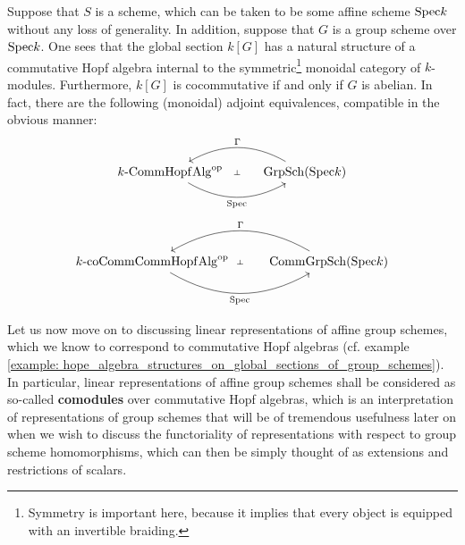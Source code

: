             \begin{example} \label{example: hope_algebra_structures_on_global_sections_of_group_schemes}
                Suppose that $S$ is a scheme, which can be taken to be some affine scheme $\mathrm{Spec} k$ without any loss of generality. In addition, suppose that $G$ is a group scheme over $\mathrm{Spec} k$. One sees that the global section $k[G]$ has a natural structure of a commutative Hopf algebra internal to the symmetric\footnote{Symmetry is important here, because it implies that every object is equipped with an invertible braiding.} monoidal category of $k$-modules. Furthermore, $k[G]$ is cocommutative if and only if $G$ is abelian. In fact, there are the following (monoidal) adjoint equivalences, compatible in the obvious manner:
                    $$
                        \begin{tikzcd}
                        	{k\-\Comm\Hopf\Alg^{\op}} & {\Grp\Sch(\Spec k)}
                        	\arrow[""{name=0, anchor=center, inner sep=0}, "{\Spec }"', bend right, from=1-1, to=1-2]
                        	\arrow[""{name=1, anchor=center, inner sep=0}, "\Gamma"', bend right, from=1-2, to=1-1]
                        	\arrow["\dashv"{anchor=center, rotate=-90}, draw=none, from=1, to=0]
                        \end{tikzcd}
                    $$
                    $$
                        \begin{tikzcd}
                        	{k\-\co\Comm\Comm\Hopf\Alg^{\op}} & {\Comm\Grp\Sch(\Spec k)}
                        	\arrow[""{name=0, anchor=center, inner sep=0}, "{\Spec }"', bend right, from=1-1, to=1-2]
                        	\arrow[""{name=1, anchor=center, inner sep=0}, "\Gamma"', bend right, from=1-2, to=1-1]
                        	\arrow["\dashv"{anchor=center, rotate=-90}, draw=none, from=1, to=0]
                        \end{tikzcd}
                    $$
            \end{example}
            
            Let us now move on to discussing linear representations of affine group schemes, which we know to correspond to commutative Hopf algebras (cf. example \ref{example: hope_algebra_structures_on_global_sections_of_group_schemes}). In particular, linear representations of affine group schemes shall be considered as so-called \textbf{comodules} over commutative Hopf algebras, which is an interpretation of representations of group schemes that will be of tremendous usefulness later on when we wish to discuss the functoriality of representations with respect to group scheme homomorphisms, which can then be simply thought of as extensions and restrictions of scalars. 
            
